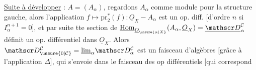 \uline{Suite à développer} : $A=(A_\alpha)$, regardons $A_\alpha$ comme module pour la structure gauche, alors l'application $f\longmapsto\mathrm{pr}_2^{*}(f):\underline O_X\mathbin{-} A_\alpha$ est un op. diff. [d'ordre $n$ si $I_\alpha^{n+1}=0$], et par suite tte  section de $\underline{\mathrm{Hom}}_{\underline O_{\unsure{\alpha|X}}}(A_\alpha,\underline O_X)=\underline{\mathscr D}_{\alpha}^{\mathcal C}$ définit un op. différentiel dans $\underline O_X$. Alors $\mathscr D_{\unsure{0|\mathcal C}}^{\mathcal C}=\underline{\lim}_{\alpha}\mathscr D_{\alpha}^{\mathcal C}$ est un faisceau d'algèbres  [grâce à l'application $\Delta$], qui s'envoie dans le faisceau des op différentiels [qui correspond


